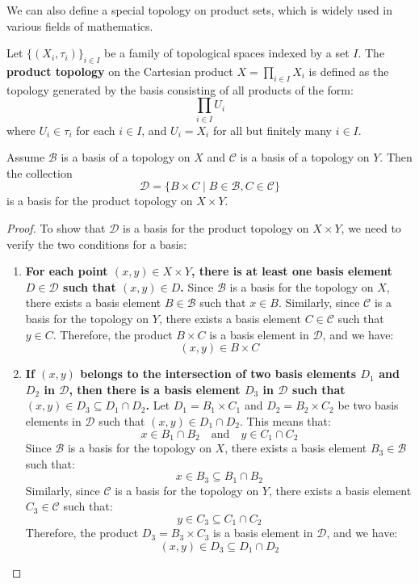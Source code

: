 We can also define a special topology on product sets, which is widely used in various fields of mathematics.

\begin{definition}
Let $\{(X_i, \tau_i)\}_{i \in I}$ be a family of topological spaces indexed by a set $I$. The \textbf{product topology} on the Cartesian product $X = \prod_{i \in I} X_i$ is defined as the topology generated by the basis consisting of all products of the form:
\[\prod_{i \in I} U_i\]
where $U_i \in \tau_i$ for each $i \in I$, and $U_i = X_i$ for all but finitely many $i \in I$.
\end{definition}

\begin{theorem}
Assume $\mathcal{B}$ is a basis of a topology on $X$ and $\mathcal{C}$ is a basis of a topology on $Y$. Then the collection
\[\mathcal{D} = \{ B \times C \mid B \in \mathcal{B}, C \in \mathcal{C} \} \]
is a basis for the product topology on $X \times Y$.
\end{theorem}

\begin{proof}
To show that $\mathcal{D}$ is a basis for the product topology on $X \times Y$, we need to verify the two conditions for a basis:
\begin{enumerate}
    \item \textbf{For each point $(x, y) \in X \times Y$, there is at least one basis element $D \in \mathcal{D}$ such that $(x, y) \in D$.} 
    Since $\mathcal{B}$ is a basis for the topology on $X$, there exists a basis element $B \in \mathcal{B}$ such that $x \in B$. Similarly, since $\mathcal{C}$ is a basis for the topology on $Y$, there exists a basis element $C \in \mathcal{C}$ such that $y \in C$. Therefore, the product $B \times C$ is a basis element in $\mathcal{D}$, and we have:
    \[
    (x, y) \in B \times C
    \]
    
    \item \textbf{If $(x, y)$ belongs to the intersection of two basis elements $D_1$ and $D_2$ in $\mathcal{D}$, then there is a basis element $D_3$ in $\mathcal{D}$ such that $(x, y) \in D_3 \subseteq D_1 \cap D_2$.} 
    Let $D_1 = B_1 \times C_1$ and $D_2 = B_2 \times C_2$ be two basis elements in $\mathcal{D}$ such that $(x, y) \in D_1 \cap D_2$. This means that:
    \[
    x \in B_1 \cap B_2 \quad \text{and} \quad y \in C_1 \cap C_2
    \]
    Since $\mathcal{B}$ is a basis for the topology on $X$, there exists a basis element $B_3 \in \mathcal{B}$ such that:
    \[
    x \in B_3 \subseteq B_1 \cap B_2
    \]
    Similarly, since $\mathcal{C}$ is a basis for the topology on $Y$, there exists a basis element $C_3 \in \mathcal{C}$ such that:
    \[
    y \in C_3 \subseteq C_1 \cap C_2
    \]
    Therefore, the product $D_3 = B_3 \times C_3$ is a basis element in $\mathcal{D}$, and we have:
    \[(x, y) \in D_3 \subseteq D_1 \cap D_2\]
\end{enumerate}
\end{proof}

